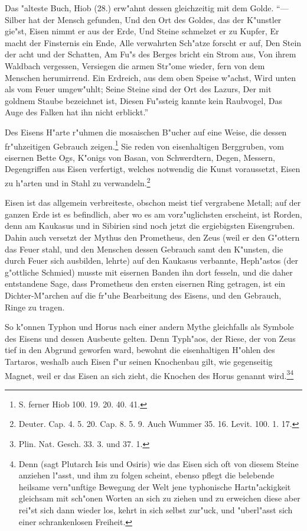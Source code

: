 \documentclass[a4paper, 11pt, oneside, polutonikogreek, german]{article}
\begin{document}
Das "alteste Buch, Hiob (28.) erw"ahnt dessen gleichzeitig mit dem Golde. "`--- Silber hat der Mensch gefunden, Und den Ort des Goldes, das der K"unstler gie"st, Eisen nimmt er aus der Erde, Und Steine schmelzet er zu Kupfer, Er macht der Finsternis ein Ende, Alle verwahrten Sch"atze forscht er auf, Den Stein der acht und der Schatten, Am Fu"s des Berges bricht ein Strom aus, Von ihrem Waldbach vergessen, Versiegen die armen Str"ome wieder, fern von dem Menschen herumirrend. Ein Erdreich, aus dem oben Speise w"achst, Wird unten als vom Feuer umgew"uhlt; Seine Steine sind der Ort des Lazurs, Der mit goldnem Staube bezeichnet ist, Diesen Fu"ssteig kannte kein Raubvogel, Das Auge des Falken hat ihn nicht erblickt."'

Des Eisens H"arte r"uhmen die mosaischen B"ucher auf eine Weise, die dessen fr"uhzeitigen Gebrauch zeigen.\footnote{S. ferner Hiob 100. 19. 20. 40. 41.} Sie reden von eisenhaltigen Berggruben, vom eisernen Bette Ogs, K"onigs von Basan, von Schwerdtern, Degen, Messern, Degengriffen aus Eisen verfertigt, welches notwendig die Kunst voraussetzt, Eisen zu h"arten und in Stahl zu verwandeln.\footnote{Deuter. Cap. 4. 5. 20. Cap. 8. 5. 9. Auch Wummer 35. 16. Levit. 100. 1. 17.}

Eisen ist das allgemein verbreiteste, obschon meist tief vergrabene Metall; auf der ganzen Erde ist es befindlich, aber wo es am vorz"uglichsten erscheint, ist Rorden, denn am Kaukasus und in Sibirien sind noch jetzt die ergiebigsten Eisengruben. Dahin auch versetzt der Mythus den Prometheus, den Zeus (weil er den G"ottern das Feuer stahl, und den Menschen dessen Gebrauch samt den K"unsten, die durch Feuer sich ausbilden, lehrte) auf den Kaukasus verbannte, Heph"astos (der g"ottliche Schmied) musste mit eisernen Banden ihn dort fesseln, und die daher entstandene Sage, dass Prometheus den ersten eisernen Ring getragen, ist ein Dichter-M"archen auf die fr"uhe Bearbeitung des Eisens, und den Gebrauch, Ringe zu tragen.

So k"onnen Typhon und Horus nach einer andern Mythe gleichfalls als Symbole des Eisens und dessen Ausbeute gelten. Denn Typh"aos, der Riese, der von Zeus tief in den Abgrund geworfen ward, bewohnt die eisenhaltigen H"ohlen des Tartaros, weshalb auch Eisen f"ur seinen Knochenbau gilt, wie gegenseitig Magnet, weil er das Eisen an sich zieht, die Knochen des Horus genannt wird.\footnote{Plin. Nat. Gesch. 33. 3. und 37. 1.}\footnote{Denn (sagt Plutarch Isis und Osiris) wie das Eisen sich oft von diesem Steine anziehen l"asst, und ihm zu folgen scheint, ebenso pflegt die belebende heilsame vern"unftige Bewegung der Welt jene typhonische Hartn"ackigkeit gleichsam mit sch"onen Worten an sich zu ziehen und zu erweichen diese aber rei"st sich dann wieder los, kehrt in sich selbst zur"uck, und "uberl"asst sich einer schrankenlosen Freiheit.}
\end{document}
